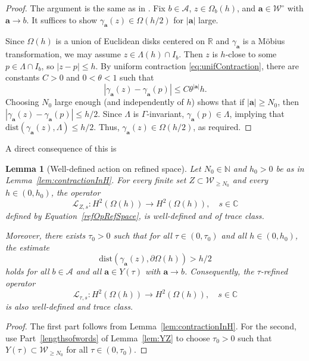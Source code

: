 \documentclass[12pt,letterpaper]{amsart}
\theoremstyle{plain}
\newtheorem{lemma}[prop]{Lemma}
\theoremstyle{definition}
\theoremstyle{remark}
\newcommand{\Aa}{\textbf{a}}
\newcommand{\CC}{\mathbb{C}}
\begin{document}
\begin{proof}
The argument is the same as in \cite[Lemma~3.2]{Naud14}. Fix $b \in \mathcal{A}$, $z \in \Omega_b(h)$, and $\Aa \in \mathcal{W}^\circ$ with $\Aa \to b$.  It suffices to show $\gamma_{\Aa}(z) \in \Omega(h/2)$ for $|\Aa|$ large.

Since $\Omega(h)$ is a union of Euclidean disks centered on $\mathbb{R}$ and $\gamma_{\Aa}$ is a Möbius transformation, we may assume $z \in \Lambda(h) \cap I_b$. Then $z$ is $h$-close to some $p \in \Lambda \cap I_b$, so $|z - p| \le h$. By uniform contraction \eqref{eq:unifContraction}, there are constants $C > 0$ and $0 < \theta < 1$ such that
\[
|\gamma_{\Aa}(z) - \gamma_{\Aa}(p)| \le C \theta^{|\Aa|} h.
\]
Choosing $N_0$ large enough (and independently of $h$) shows that if $|\Aa| \ge N_0$, then $|\gamma_{\Aa}(z) - \gamma_{\Aa}(p)| \le h/2$. Since $\Lambda$ is $\Gamma$-invariant, $\gamma_{\Aa}(p) \in \Lambda$, implying that $\mathrm{dist}(\gamma_{\Aa}(z), \Lambda) \le h/2.$ Thus, $\gamma_{\Aa}(z) \in \Omega(h/2)$, as required.
\end{proof}

A direct consequence of this is

\begin{lemma}[Well-defined action on refined space]\label{lem:welldefinedness}
Let $N_0 \in \mathbb{N}$ and $h_0 > 0$ be as in Lemma~\ref{lem:contractionInH}. For every finite set $Z \subset \mathcal{W}_{\ge N_0}$ and every $h \in (0, h_0)$, the operator
\begin{equation}\label{defi:refTOonRefS}
\mathcal{L}_{Z,s} \colon H^2(\Omega(h)) \to H^2(\Omega(h)), \quad s \in \CC
\end{equation}
defined by Equation~\eqref{refOpRefSpace}, is well-defined and of trace class.

Moreover, there exists $\tau_0 > 0$ such that for all $\tau \in (0, \tau_0)$ and all $h \in (0, h_0)$, the estimate
\[
\mathrm{dist}(\gamma_{\Aa}(z), \partial \Omega(h)) > h/2
\]
holds for all $b \in \mathcal{A}$ and all $\Aa \in Y(\tau)$ with $\Aa \to b$. Consequently, the $\tau$-refined operator
\begin{equation}\label{defi:refTOonRefS_2}
\mathcal{L}_{\tau,s} \colon H^2(\Omega(h)) \to H^2(\Omega(h)), \quad s \in \CC
\end{equation}
is also well-defined and trace class.
\end{lemma}

\begin{proof}
The first part follows from Lemma~\ref{lem:contractionInH}. For the second, use Part~\eqref{lengthsofwords} of Lemma~\ref{lem:YZ} to choose $\tau_0 > 0$ such that $Y(\tau) \subset \mathcal{W}_{\ge N_0}$ for all $\tau \in (0, \tau_0)$. 
\end{proof}
\end{document}
